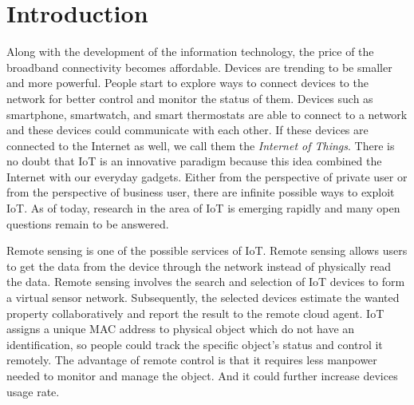 \documentclass[12pt,journal]{IEEEtran}
\begin{document}
%
\IEEEpeerreviewmaketitle



\section{Introduction}
% 
% 
% 
% 
\IEEEPARstart
{A}{long} with the development of the information technology, the price of the broadband connectivity becomes affordable. Devices are trending to be  smaller and more powerful. People start to explore ways to connect devices to the network for better control and monitor the status of them. Devices such as smartphone, smartwatch, and smart thermostats are able to connect to a network and these devices could communicate with each other. If these devices are connected to the Internet as well, we call them the \textit{Internet of Things}. There is no doubt that IoT is an innovative paradigm \cite{Atzori} because this idea combined the Internet with our everyday gadgets. Either from the perspective of private user or from the perspective of business user, there are infinite possible ways to exploit IoT. As of today, research in the area of IoT is emerging rapidly and many open questions remain to be answered.

Remote sensing is one of the possible services of IoT. Remote sensing allows users to get the data from the device through the network instead of physically read the data. Remote sensing involves the search and selection of IoT devices to form a virtual sensor network. Subsequently, the selected devices estimate the wanted property collaboratively and report the result to the remote cloud agent. IoT assigns a unique MAC address to physical object which do not have an identification, so people could track the specific object’s status and control it remotely. The advantage of remote control is that it requires less manpower needed to monitor and manage the object. And it could further increase devices usage rate.
\end{document}
